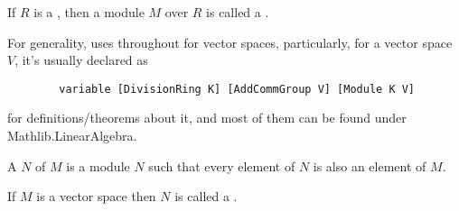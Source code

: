 \begin{definition}
    \label{VectorSpace}
    \leanok

    If $R$ is a , then a module $M$ over $R$ is called a .

\end{definition}

\begin{remark}
    \label{mk:VectorSpace}

    For generality, \Mathlib uses  throughout for vector spaces,
    particularly, for a vector space $V$, it's usually declared as

    \begin{lstlisting}
        variable [DivisionRing K] [AddCommGroup V] [Module K V]
    \end{lstlisting}

    for definitions/theorems about it, and most of them can be found under \textsf{Mathlib.LinearAlgebra}. %
    
\end{remark}

\begin{remark}
    \label{mk:Submodule}

    A  $N$ of $M$ is a module $N$ such that every element of $N$ is also an element of $M$.

    If $M$ is a vector space then $N$ is called a .

\end{remark}





    

